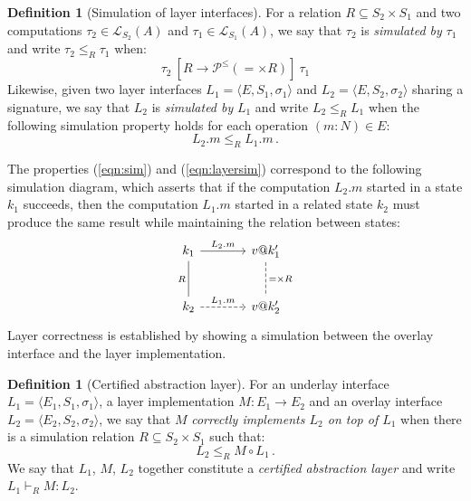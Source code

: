 \documentclass[11pt,oneside]{book}
\theoremstyle{definition}
\newtheorem{definition}[theorem]{Definition}
\begin{document}
\begin{definition}[Simulation of layer interfaces] %
For a relation $R \subseteq S_2 \times S_1$
and two computations
$\tau_2 \in \mathcal{L}_{S_2}(A)$ and
$\tau_1 \in \mathcal{L}_{S_1}(A)$,
we say that $\tau_2$ is \emph{simulated by} $\tau_1$
and write $\tau_2 \le_R \tau_1$
when:
\begin{equation} \label{eqn:sim}
  \tau_2
  \: \mathrel{[R \rightarrow \mathcal{P}^\le({=} \times R)]} \:
  \tau_1
\end{equation}
Likewise,
given two layer interfaces
$L_1 = \langle E, S_1, \sigma_1 \rangle$ and
$L_2 = \langle E, S_2, \sigma_2 \rangle$
sharing a signature,
we say that $L_2$ is \emph{simulated by} $L_1$
and write $L_2 \le_R L_1$ when
the following simulation property holds
for each operation $(m \mathbin: N) \in E$:
\begin{equation}
  \label{eqn:layersim}
  L_2.m \le_R L_1.m
  \,.
\end{equation}
\end{definition}

The properties (\ref{eqn:sim}) and (\ref{eqn:layersim})
correspond to the following simulation diagram,
which asserts that if the computation $L_2.m$
started in a state $k_1$ succeeds,
then the computation $L_1.m$
started in a related state $k_2$ must produce
the same result
while maintaining the relation between states:
\[
  \begin{tikzcd}[sep=large]
    k_1 \ar[r, "L_2.m"] \ar[d, "R"', dash] &
    v@k_1' \ar[d, "{=} \times R", dash, dashed] \\
    k_2 \ar[r, "L_1.m", dashed] &
    v@k_2'
  \end{tikzcd}
\]
Layer correctness is established by showing
a simulation between the overlay interface
and the layer implementation.

\begin{definition}[Certified abstraction layer] %
For an underlay interface $L_1 = \langle E_1, S_1, \sigma_1 \rangle$,
a layer implementation $M : E_1 \rightarrow E_2$ and
an overlay interface $L_2 = \langle E_2, S_2, \sigma_2 \rangle$,
we say that $M$
\emph{correctly implements $L_2$ on top of $L_1$}
when there is a simulation relation $R \subseteq S_2 \times S_1$
such that:
\[
  L_2 \le_R M \circ L_1 \,.
\]
We say that $L_1$, $M$, $L_2$ together
constitute a \emph{certified abstraction layer}
and write $L_1 \vdash_R M : L_2$.
\end{definition}
\end{document}
